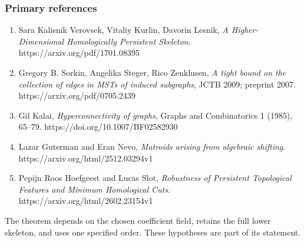 \hypertarget{af-3f6acd6e5b-primary-references}{%
\subsubsection{Primary references}\label{af-3f6acd6e5b-primary-references}}

\begin{enumerate}
\def\labelenumi{\arabic{enumi}.}
\tightlist
\item
  Sara Kalisnik Verovsek, Vitaliy Kurlin, Davorin Lesnik, \emph{A Higher-Dimensional Homologically Persistent Skeleton}. https://arxiv.org/pdf/1701.08395
\item
  Gregory B. Sorkin, Angelika Steger, Rico Zenklusen, \emph{A tight bound on the collection of edges in MSTs of induced subgraphs}, JCTB 2009; preprint 2007. https://arxiv.org/pdf/0705.2439
\item
  Gil Kalai, \emph{Hyperconnectivity of graphs}, Graphs and Combinatorics 1 (1985), 65--79. https://doi.org/10.1007/BF02582930
\item
  Lazar Guterman and Eran Nevo, \emph{Matroids arising from algebraic shifting}. https://arxiv.org/html/2512.03294v1
\item
  Pepijn Roos Hoefgeest and Lucas Slot, \emph{Robustness of Persistent Topological Features and Minimum Homological Cuts}. https://arxiv.org/html/2602.23154v1
\end{enumerate}

The theorem depends on the chosen coefficient field, retains the full lower skeleton, and uses one specified order. These hypotheses are part of its statement.
